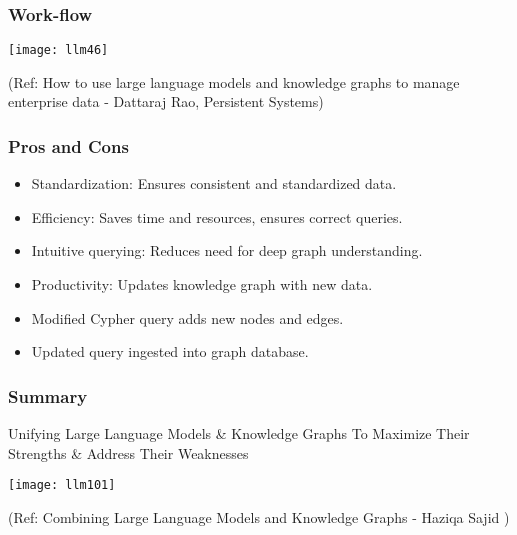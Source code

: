 \begin{frame}[fragile]\frametitle{Work-flow}

\begin{center}
\texttt{[image: llm46]}

{\tiny (Ref: How to use large language models and knowledge graphs to manage enterprise data - Dattaraj Rao, Persistent Systems)}
\end{center}
\end{frame}


\begin{frame}[fragile]\frametitle{Pros and Cons}

\begin{itemize}
\item Standardization: Ensures consistent and standardized data.
\item Efficiency: Saves time and resources, ensures correct queries.
\item Intuitive querying: Reduces need for deep graph understanding.
\item Productivity: Updates knowledge graph with new data.
\item Modified Cypher query adds new nodes and edges.
\item Updated query ingested into graph database.
\end{itemize}
\end{frame}

\begin{frame}[fragile]\frametitle{Summary}

Unifying Large Language Models \& Knowledge Graphs To Maximize Their Strengths \& Address Their Weaknesses

\begin{center}
\texttt{[image: llm101]}
\end{center}	

{\tiny (Ref: Combining Large Language Models and Knowledge Graphs - Haziqa Sajid )}

\end{frame}

